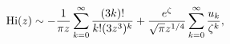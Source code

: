 \[\mathop{\mathrm{Hi}\/}\nolimits\!\left(z\right)\sim-\frac{1}{\pi z}\sum_{k=0}^%
{\infty}\frac{(3k)!}{k!(3z^{3})^{k}}+\frac{e^{\zeta}}{\sqrt{\pi}z^{1/4}}\sum_{%
k=0}^{\infty}\frac{u_{k}}{\zeta^{k}},\]